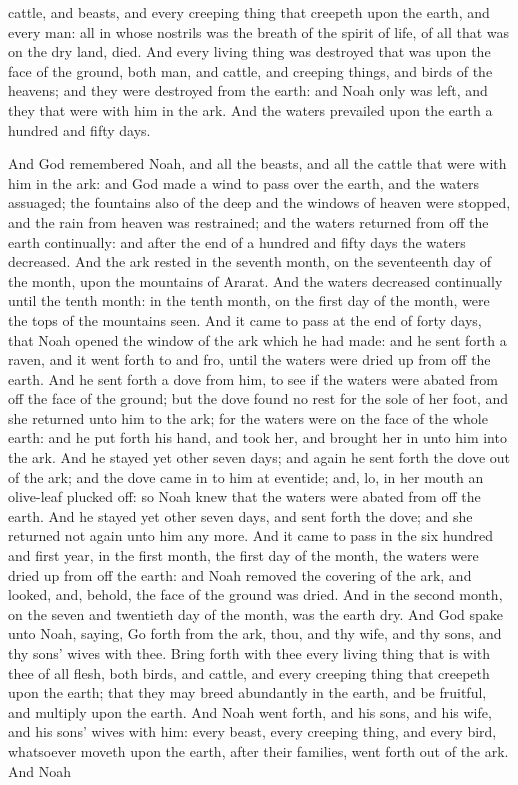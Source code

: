 cattle, and beasts, and every creeping thing that creepeth upon the earth, and every man: all in whose nostrils was the breath of the spirit of life, of all that was on the dry land, died. And every living thing was destroyed that was upon the face of the ground, both man, and cattle, and creeping things, and birds of the heavens; and they were destroyed from the earth: and Noah only was left, and they that were with him in the ark. And the waters prevailed upon the earth a hundred and fifty days. 

And God remembered Noah, and all the beasts, and all the cattle that were with him in the ark: and God made a wind to pass over the earth, and the waters assuaged; the fountains also of the deep and the windows of heaven were stopped, and the rain from heaven was restrained; and the waters returned from off the earth continually: and after the end of a hundred and fifty days the waters decreased. And the ark rested in the seventh month, on the seventeenth day of the month, upon the mountains of Ararat. And the waters decreased continually until the tenth month: in the tenth month, on the first day of the month, were the tops of the mountains seen.  And it came to pass at the end of forty days, that Noah opened the window of the ark which he had made: and he sent forth a raven, and it went forth to and fro, until the waters were dried up from off the earth. And he sent forth a dove from him, to see if the waters were abated from off the face of the ground; but the dove found no rest for the sole of her foot, and she returned unto him to the ark; for the waters were on the face of the whole earth: and he put forth his hand, and took her, and brought her in unto him into the ark. And he stayed yet other seven days; and again he sent forth the dove out of the ark; and the dove came in to him at eventide; and, lo, in her mouth an olive-leaf plucked off: so Noah knew that the waters were abated from off the earth. And he stayed yet other seven days, and sent forth the dove; and she returned not again unto him any more.  And it came to pass in the six hundred and first year, in the first month, the first day of the month, the waters were dried up from off the earth: and Noah removed the covering of the ark, and looked, and, behold, the face of the ground was dried. And in the second month, on the seven and twentieth day of the month, was the earth dry. And God spake unto Noah, saying, Go forth from the ark, thou, and thy wife, and thy sons, and thy sons’ wives with thee. Bring forth with thee every living thing that is with thee of all flesh, both birds, and cattle, and every creeping thing that creepeth upon the earth; that they may breed abundantly in the earth, and be fruitful, and multiply upon the earth. And Noah went forth, and his sons, and his wife, and his sons’ wives with him: every beast, every creeping thing, and every bird, whatsoever moveth upon the earth, after their families, went forth out of the ark.  And Noah 